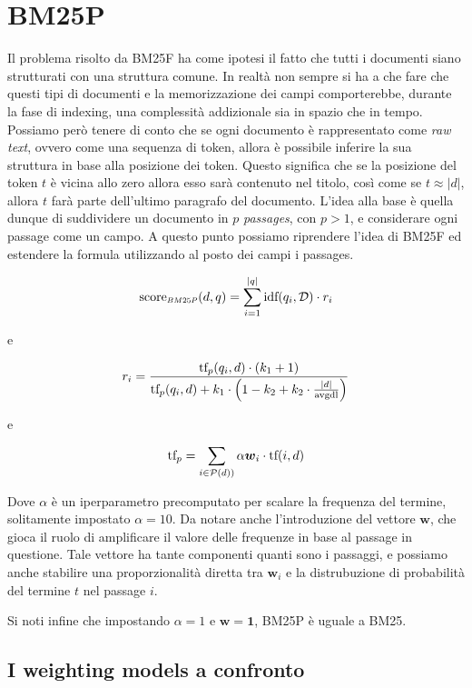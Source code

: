 \section{BM25P}
Il problema risolto da BM25F ha come ipotesi il fatto che tutti i documenti siano strutturati con una struttura comune.
In realtà non sempre si ha a che fare che questi tipi di documenti e la memorizzazione dei campi comporterebbe, durante
la fase di indexing, una complessità addizionale sia in spazio che in tempo.
Possiamo però tenere di conto che se ogni documento è rappresentato come \textit{raw text}, ovvero come una sequenza
di token, allora è possibile inferire la sua struttura in base alla posizione dei token.
Questo significa che se la posizione del token $t$ è vicina allo zero allora esso sarà contenuto nel titolo, così come
se $t \approx \left|d\right|$, allora $t$ farà parte dell'ultimo paragrafo del documento.
L'idea alla base è quella dunque di suddividere un documento in $p$ \textit{passages}, con $p>1$, e
considerare ogni passage come un campo. A questo punto possiamo riprendere l'idea di BM25F
ed estendere la formula utilizzando al posto dei campi i passages.

\begin{definizione}[BM25 Passages]\label{def:bm25p}
		$$
	\sco_{\scaleto{BM25P}{4pt}}(d, q) = \sum_{i=1}^{|q|} \text{idf}(q_i, \mathcal{D}) \cdot r_i
	$$
	
	e
	
	$$
	r_i = \frac{
		\text{tf}_p(q_i, d) \cdot (k_1 +1)
	}{
		\text{tf}_p(q_i, d) + k_1 \cdot \left(1-k_2 + k_2 \cdot \frac{\left|d\right|}{\text{avgdl}}\right)
	}
	$$
	
	e
	
	$$
	\text{tf}_p = \sum_{i \in \mathcal{P}(d))}{\alpha \boldsymbol{w}_i \cdot \text{tf}(i, d)}
	$$
	
	Dove $\alpha$ è un iperparametro precomputato per scalare la frequenza del termine, solitamente impostato $\alpha = 10$.
	Da notare anche l'introduzione del vettore $\boldsymbol{w}$, che gioca il ruolo di amplificare il valore delle frequenze
	in base al passage in questione.
	Tale vettore ha tante componenti quanti sono i passaggi, e possiamo anche stabilire una proporzionalità
	diretta tra $\boldsymbol{w}_i$ e la distrubuzione di probabilità del termine $t$ nel passage $i$.
	
	Si noti infine che impostando $\alpha=1$ e $\boldsymbol{w} = \boldsymbol{1}$, BM25P è uguale a BM25.
\end{definizione}

\subsection{I weighting models a confronto}
 
